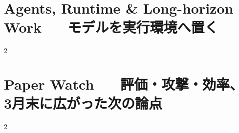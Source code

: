\documentclass[lualatex,a4paper,11pt]{jlreq}
\begin{document}
\Needspace{0.45\textheight}
\bigskip
\section{Agents, Runtime \& Long-horizon Work — モデルを実行環境へ置く}
\label{pkg:agents-runtime-long-horizon-march}
\vspace{0.15em}
\begin{multicols}{2}

\end{multicols}

\medskip


\Needspace{0.45\textheight}
\bigskip
\section{Paper Watch — 評価・攻撃・効率、3月末に広がった次の論点}
\label{pkg:paper-watch-march}
\vspace{0.15em}
\begin{multicols}{2}

\end{multicols}

\medskip


\Needspace{0.30\textheight}
\bigskip
\printbibliography[title={References / Source Notes}]
\end{document}
